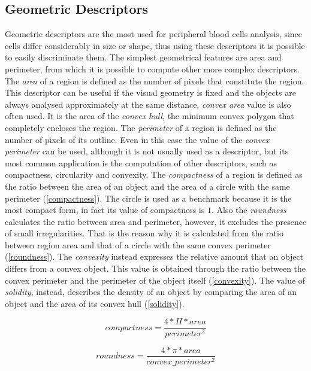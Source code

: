 \documentclass[final,a4paper,12pt,english]{UnicaPhdThesis3}
\begin{document}
\subsection{Geometric Descriptors} %
Geometric descriptors are the most used for peripheral blood cells analysis, since cells differ considerably in size or shape, thus using these descriptors it is possible to easily discriminate them. The simplest geometrical features are area and perimeter, from which it is possible to compute other more complex descriptors. The \textit{area} of a region is defined as the number of pixels that constitute the region. This descriptor can be useful if the visual geometry is fixed and the objects are always analysed approximately at the same distance. \textit{convex area} value is also often used. It is the area of the \textit{convex hull}, the minimum convex polygon that completely encloses the region.
The \textit{perimeter} of a region is defined as the number of pixels of its outline. Even in this case the value of the \textit{convex perimeter} can be used, although it is not usually used as a descriptor, but its most common application is the computation of other descriptors, such as compactness, circularity and convexity. The \textit{compactness} of a region is defined as the ratio between the area of an object and the area of a circle with the same perimeter (\ref{compactness}). The circle is used as a benchmark because it is the most compact form, in fact its value of compactness is $1$. Also the \textit{roundness} calculates the ratio between area and perimeter, however, it excludes the presence of small irregularities. That is the reason why it is calculated from the ratio between region area and that of a circle with the same convex perimeter (\ref{roundness}). The \textit{convexity} instead expresses the relative amount that an object differs from a convex object. This value is obtained through the ratio between the convex perimeter and the perimeter of the object itself (\ref{convexity}). The value of \textit{solidity}, instead, describes the density of an object by comparing the area of an object and the area of its convex hull (\ref{solidity}).

\begin{equation}\label{compactness}
compactness=\frac{4*\Pi*area}{perimeter^2}
\end{equation}

\begin{equation}\label{roundness}
roundness=\frac{4*\pi*area}{convex\_perimeter^2}
\end{equation}
\end{document}

